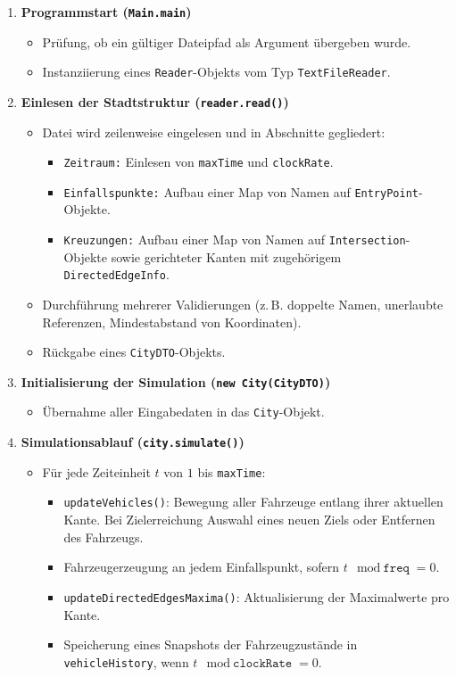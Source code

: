 \begin{enumerate}
  \item \textbf{Programmstart (\texttt{Main.main})}
  \begin{itemize}
    \item Prüfung, ob ein gültiger Dateipfad als Argument übergeben wurde.
    \item Instanziierung eines \texttt{Reader}-Objekts vom Typ \texttt{TextFileReader}.
  \end{itemize}

  \item \textbf{Einlesen der Stadtstruktur (\texttt{reader.read()})}
  \begin{itemize}
    \item Datei wird zeilenweise eingelesen und in Abschnitte gegliedert:
    \begin{itemize}
      \item \texttt{Zeitraum:} Einlesen von \texttt{maxTime} und \texttt{clockRate}.
      \item \texttt{Einfallspunkte:} Aufbau einer Map von Namen auf \texttt{EntryPoint}-Objekte.
      \item \texttt{Kreuzungen:} Aufbau einer Map von Namen auf \texttt{Intersection}-Objekte sowie gerichteter Kanten mit zugehörigem \texttt{DirectedEdgeInfo}.
    \end{itemize}
    \item Durchführung mehrerer Validierungen (z.\,B. doppelte Namen, unerlaubte Referenzen, Mindestabstand von Koordinaten).
    \item Rückgabe eines \texttt{CityDTO}-Objekts.
  \end{itemize}

  \item \textbf{Initialisierung der Simulation (\texttt{new City(CityDTO)})}
  \begin{itemize}
    \item Übernahme aller Eingabedaten in das \texttt{City}-Objekt.
  \end{itemize}

  \item \textbf{Simulationsablauf (\texttt{city.simulate()})}
  \begin{itemize}
    \item Für jede Zeiteinheit $t$ von $1$ bis \texttt{maxTime}:
    \begin{itemize}
      \item \texttt{updateVehicles()}: Bewegung aller Fahrzeuge entlang ihrer aktuellen Kante. Bei Zielerreichung Auswahl eines neuen Ziels oder Entfernen des Fahrzeugs.
      \item Fahrzeugerzeugung an jedem Einfallspunkt, sofern $t \mod \texttt{freq} = 0$.
      \item \texttt{updateDirectedEdgesMaxima()}: Aktualisierung der Maximalwerte pro Kante.
      \item Speicherung eines Snapshots der Fahrzeugzustände in \texttt{vehicleHistory}, wenn $t \mod \texttt{clockRate} = 0$.
    \end{itemize}
  \end{itemize}


\end{enumerate}
